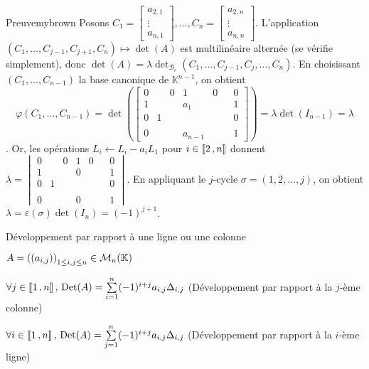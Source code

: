     \begin{demo}{Preuve}{mybrown}
        Posons $C_1 = \begin{bmatrix}
            a_{2,1} \\
            \vdots \\
            a_{n,1}
        \end{bmatrix}, \ldots, C_n = \begin{bmatrix}
            a_{2,n} \\
            \vdots \\
            a_{n,n}
        \end{bmatrix}$.
        L’application $(C_1,\ldots,C_{j-1}, C_{j+1}, C_n) \mapsto \det(A)$ est multilinéaire alternée (se vérifie simplement), donc $\det(A) = \lambda \det_{\mathcal{B}_c}(C_1,\ldots, C_{j-1}, C_{j}, \ldots, C_n)$. En choisissant $(C_1,\ldots,C_{n-1})$ la base canonique de $\mathbb{K}^{n-1}$, on obtient \[  \varphi(C_1,\ldots,C_{n-1}) = \det\left(\begin{bmatrix}
            0 & & 0 & 1 & 0 & & 0 \\
            1 & & & a_1 & & & 1 \\
            0 & 1 & & & & & 0 \\ 
            & & & & & & \\
            0 & & & a_{n-1} & & & 1 
        \end{bmatrix}\right) = \lambda \det(I_{n-1}) = \lambda \]   . Or, les opérations $L_i \leftarrow L_i - a_i L_1$ pour $i \in \left\llbracket 2 \, , n \right\rrbracket$ donnent $\lambda = \begin{vmatrix}
            0 & & 0 & 1 & 0 & & 0 \\
            1 & & & 0 & & & 1 \\
            0 & 1 & & & & & 0 \\ 
            & & & & & & \\
            0 & & & 0 & & & 1 
        \end{vmatrix}$. En appliquant le $j$-cycle $\sigma = (1,2,\ldots,j)$, on obtient $\lambda = \varepsilon(\sigma) \det(I_n) = (-1)^{j+1}$.
    \end{demo}

    \begin{theo}{Développement par rapport à une ligne ou une colonne}{}
        \begin{soient}
            \item $A = \left((a_{i,j})\right)_{1 \leq i,j \leq n} \in \mathcal{M}_{n}(\mathbb{K})$
        \end{soient}
        \begin{alors}
            \item $\forall j \in \left\llbracket 1 \, , n \right\rrbracket, \, \operatorname{Det}(A) = \sum\limits_{i=1}^n (-1)^{i+j} a_{i,j} \Delta_{i,j}$ (Développement par rapport à la $j$-ème colonne)
            \item $\forall i \in \left\llbracket 1 \, , n \right\rrbracket, \, \operatorname{Det}(A) = \sum\limits_{j=1}^n (-1)^{i+j} a_{i,j} \Delta_{i,j}$ (Développement par rapport à la $i$-ème ligne)
        \end{alors}
    \end{theo}

